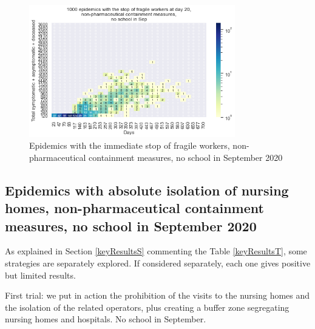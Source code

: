\documentclass[11pt]{article}
\begin{document}
\begin{figure}[H]
\begin{center}
\includegraphics[width=0.8\textwidth]{HM30_readRunResults1k_with_sFW_at20_plusHMlog.png}
\caption{Epidemics with the immediate stop of fragile workers, non-pharmaceutical containment measures, no school in September 2020}
\label{EpidemicsFWsHM}
\end{center}
\end{figure}

\subsection{Epidemics with absolute isolation of nursing homes, non-pharmaceutical containment measures, no school in September 2020}
\label{EpidemicsNHsS}

As explained in Section \ref{keyResultsS} commenting the Table \ref{keyResultsT}, some strategies are separately explored. If considered separately, each one gives positive but limited results. 

First trial: we put in action the prohibition of the visits to the nursing homes and the isolation of the related operators, plus creating a buffer zone segregating nursing homes and hospitals. No school in September.
\end{document}

